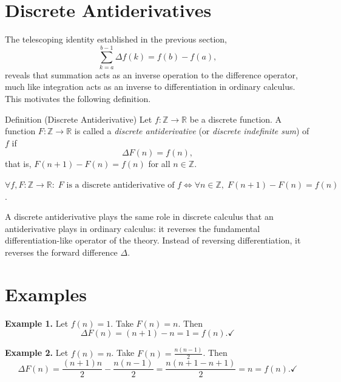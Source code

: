 
\section{Discrete Antiderivatives}
\label{sec:discrete-antiderivative}

The telescoping identity established in the previous section,
\[
\sum_{k=a}^{b-1} \Delta f(k) = f(b) - f(a),
\]
reveals that summation acts as an inverse operation to the difference
operator, much like integration acts as an inverse to differentiation
in ordinary calculus. This motivates the following definition.

\begin{definitionbox}{Definition (Discrete Antiderivative)}
Let \(f : \mathbb{Z} \to \mathbb{R}\) be a discrete function.
A function \(F : \mathbb{Z} \to \mathbb{R}\) is called a
\emph{discrete antiderivative} (or \emph{discrete indefinite sum}) of \(f\) if
\[
\Delta F(n) = f(n),
\]
that is, \(F(n+1) - F(n) = f(n)\) for all \(n \in \mathbb{Z}\).
\end{definitionbox}
\label{def:discrete-antiderivative}

\begin{remark*}
\(\forall f,F : \mathbb{Z}\to\mathbb{R}:\;
F \text{ is a discrete antiderivative of } f
\iff
\forall n \in \mathbb{Z},\; F(n+1) - F(n) = f(n)\).
\end{remark*}

\begin{remark*}[Analogy]
A discrete antiderivative plays the same role in discrete calculus that an
antiderivative plays in ordinary calculus: it reverses the fundamental
differentiation-like operator of the theory. Instead of reversing
differentiation, it reverses the forward difference \(\Delta\).
\end{remark*}

\section*{Examples}

\textbf{Example 1.} Let \(f(n) = 1\). Take \(F(n) = n\). Then
\[
\Delta F(n) = (n+1) - n = 1 = f(n). \checkmark
\]

\textbf{Example 2.} Let \(f(n) = n\). Take \(F(n) = \tfrac{n(n-1)}{2}\). Then
\[
\Delta F(n)
= \frac{(n+1)n}{2} - \frac{n(n-1)}{2}
= \frac{n(n+1-n+1)}{2}
= n = f(n). \checkmark
\]

